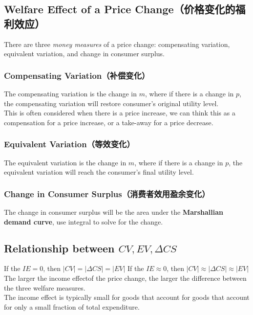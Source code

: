 \subsection{Welfare Effect of a Price Change（价格变化的福利效应）}
There are three \textit{money measures} of a price change: compensating variation, equivalent variation, and change in consumer surplus. \\
\subsubsection{Compensating Variation（补偿变化）}
The compensating variation is the change in $m$, where if there is a change in $p$, the compensating variation will restore consumer's original utility level. \\
This is often considered when there is a price increase, we can think this as a compensation for a price increase, or a take-away for a price decrease.

\subsubsection{Equivalent Variation（等效变化）}
The equivalent variation is the change in $m$, where if there is a change in $p$, the equivalent variation will reach the consumer's final utility level.

\subsubsection{Change in Consumer Surplus（消费者效用盈余变化）}
The change in consumer surplus will be the area under the \textbf{Marshallian demand curve}, use integral to solve for the change.

\subsection{Relationship between $CV, EV, \Delta CS$}
If the $IE = 0$, then $|CV| = |\Delta CS| = |EV|$
If the $IE \approx 0$, then $|CV| \approx |\Delta CS| \approx |EV|$
The larger the income effectof the price change, the larger the difference between the three welfare measures. \\
The income effect is typically small for goods that account for goods that account for only a small fraction of total expenditure.

\newpage